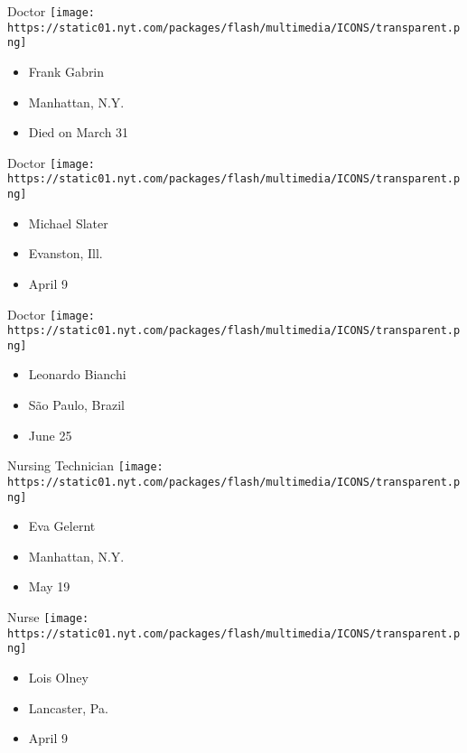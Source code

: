 \protect\hyperlink{item-frank-gabrin}{}

Doctor
\texttt{[image: https://static01.nyt.com/packages/flash/multimedia/ICONS/transparent.png]}

\begin{itemize}
\tightlist
\item
  Frank Gabrin
\item
  Manhattan, N.Y.
\item
  Died on March 31
\end{itemize}

\protect\hyperlink{item-michael-slater}{}

Doctor
\texttt{[image: https://static01.nyt.com/packages/flash/multimedia/ICONS/transparent.png]}

\begin{itemize}
\tightlist
\item
  Michael Slater
\item
  Evanston, Ill.
\item
  April 9
\end{itemize}

\protect\hyperlink{item-leonardo-bianchi}{}

Doctor
\texttt{[image: https://static01.nyt.com/packages/flash/multimedia/ICONS/transparent.png]}

\begin{itemize}
\tightlist
\item
  Leonardo Bianchi
\item
  São Paulo, Brazil
\item
  June 25
\end{itemize}

\protect\hyperlink{item-eva-gelernt}{}

Nursing Technician
\texttt{[image: https://static01.nyt.com/packages/flash/multimedia/ICONS/transparent.png]}

\begin{itemize}
\tightlist
\item
  Eva Gelernt
\item
  Manhattan, N.Y.
\item
  May 19
\end{itemize}

\protect\hyperlink{item-lois-olney}{}

Nurse
\texttt{[image: https://static01.nyt.com/packages/flash/multimedia/ICONS/transparent.png]}

\begin{itemize}
\tightlist
\item
  Lois Olney
\item
  Lancaster, Pa.
\item
  April 9
\end{itemize}

